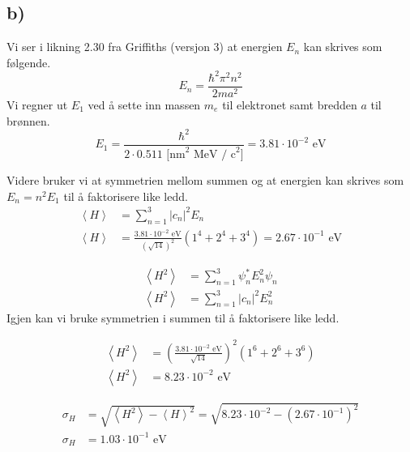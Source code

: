 \documentclass[norsk]{article}
\begin{document}
\subsection*{b)}

Vi ser i likning 2.30 fra Griffiths (versjon 3) at energien $E_n$ kan skrives som følgende. 
\begin{equation}\label{eq: E_n}
  E_n = \frac{ℏ^2π^2n^2}{2ma^2}
\end{equation}
Vi regner ut $E_1$ ved å sette inn massen $m_e$ til elektronet samt bredden $a$ til brønnen. 
\begin{equation}\label{eq: E_1}
  E_1 = \frac{ℏ^2}{2 ⋅ 0.511 \text{ [nm}^2 \text{ MeV / c}^2]} = 3.81 ⋅ 10^{-2} \text{ eV}
\end{equation}

Videre bruker vi at symmetrien mellom summen og at energien kan skrives som $E_n = n^2 E_1$ til å faktorisere like ledd. 
\begin{align}\label{eq: <H>}
  \left<H\right> &= ∑_{n=1}^{3} \left|c_n\right|^2 E_n \\
  \left<H\right> &= \frac{3.81 ⋅ 10^{-2} \text{ eV}}{\left(\sqrt{14}\right)^{2}} \left(1^{4} + 2^{4}+ 3^{4}\right) = 2.67 ⋅ 10^{-1} \text{ eV}
\end{align}

\begin{align}
\left<H^2\right> &= ∑_{n=1}^{3} ψ_n^{*}E^2_nψ_n \\
\left<H^2\right> &= ∑_{n=1}^{3} \left|c_n\right|^2 E_n^2
\end{align}
Igjen kan vi bruke symmetrien i summen til å faktorisere like ledd.

\begin{align}
\left<H^2\right> &= \left(\frac{3.81 ⋅ 10^{-2} \text{ eV}}{\sqrt{14}}\right)^2 \left(1^{6} + 2^{6} + 3^{6}\right) \\
\left<H^2\right> &= 8.23 ⋅ 10^{-2} \text{ eV}
\end{align}

\begin{align}
σ_{H} &= \sqrt{\left<H^2\right> - \left<H\right>^2} = \sqrt{8.23 ⋅ 10^{-2} - (2.67 ⋅ 10^{-1})^2}\\
σ_{H} &= 1.03 ⋅ 10^{-1} \text{ eV}
\end{align}
\end{document}
